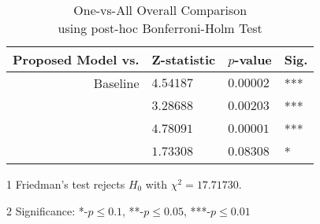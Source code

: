 \begin{table}[t]
%
\centering
\begin{threeparttable}
\caption{One-vs-All Overall Comparison\\using post-hoc Bonferroni-Holm Test}
\label{results:mc_stats}
%
\begin{tabular}{@{}r*{3}{l}@{}}
\toprule
Proposed Model vs.                       & Z-statistic    & $p$-value         & Sig.\tnote{2} \\ \midrule
Baseline                                 & $4.54187$      & $0.00002$         & ***           \\
\cite{wang2013protein}                   & $3.28688$      & $0.00203$         & ***           \\
\cite{chicco2014deep}                    & $4.78091$      & $0.00001$         & ***           \\
\cite{miranda2017feature}                & $1.73308$      & $0.08308$         & *             \\ \bottomrule
\end{tabular}
\begin{tablenotes}
\footnotesize
\item[1] Friedman's test rejects $H_{0}$ with $\chi^{2}=\num{17.71730}$.
\item[2] Significance: *-$p\leq0.1$, **-$p\leq0.05$, ***-$p\leq0.01$
\end{tablenotes}
\end{threeparttable}
\end{table}
